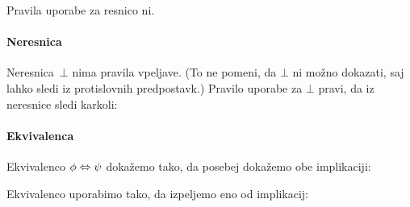 Pravila uporabe za resnico ni.

\paragraph*{Neresnica}
\label{sec:neresnica-pravila}

Neresnica~$\bot$ nima pravila vpeljave. (To ne pomeni, da $\bot$ ni možno dokazati, saj lahko sledi iz protislovnih predpostavk.)
%
Pravilo uporabe za $\bot$ pravi, da iz neresnice sledi karkoli:
%
\begin{boxDisplay}
  \begin{boxedProof}[reserved]
    \begin{boxFrame}
      \boxGap
    \end{boxFrame}
  \end{boxedProof}
\end{boxDisplay}

\paragraph*{Ekvivalenca}
\label{sec:ekvivalenca-pravila}

Ekvivalenco $\phi \Leftrightarrow \psi$ dokažemo tako, da posebej dokažemo obe implikaciji:
%
\begin{boxDisplay}
  \begin{boxedProof}
    \begin{boxFrame}
      \begin{boxNested}
      \end{boxNested}
      \begin{boxNested}
      \end{boxNested}
    \end{boxFrame}
  \end{boxedProof}
\end{boxDisplay}
%
Ekvivalenco uporabimo tako, da izpeljemo eno od implikacij:
%
%
\begin{boxDisplay}
\begin{boxedProof}[reserved]
\begin{boxFrame}
  \boxGap
\end{boxFrame}
\end{boxedProof}%
\boxProofSep
\begin{boxedProof}[reserved]
\begin{boxFrame}
  \boxGap
\end{boxFrame}
\end{boxedProof}
\end{boxDisplay}

